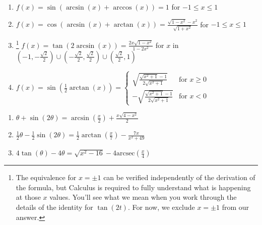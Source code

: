 \documentclass{ximera}
\begin{document}
\begin{enumerate}
\item $f(x) =\sin \left( \arcsin(x) + \arccos(x) \right) = 1$ for $-1 \leq x \leq 1$
\item $f(x) =\cos \left( \arcsin(x) + \arctan(x) \right) = \frac{\sqrt{1 - x^{2}} - x^{2}}{\sqrt{1 + x^{2}}}$ for $-1 \leq x \leq 1$
\item\!\!\footnote{The equivalence for $x = \pm 1$ can be verified independently of the derivation of the formula, but Calculus is required to fully understand what is happening at those $x$ values.  You'll see what we mean when you work through the details of the identity for $\tan(2t).$  For now, we exclude $x = \pm 1$ from our answer.} $f(x) =\tan \left( 2\arcsin(x) \right) = \frac{2x\sqrt{1 - x^{2}}}{1 - 2x^{2}}$ for $x$ in $\left(-1, -\frac{\sqrt{2}}{2}\right) \cup \left(-\frac{\sqrt{2}}{2}, \frac{\sqrt{2}}{2} \right) \cup \left(\frac{\sqrt{2}}{2}, 1\right)$
\item $f(x) =\sin \left( \frac{1}{2}\arctan(x) \right) = \left\{ \begin{array}{rr} \sqrt{\frac{\sqrt{x^{2} + 1} - 1}{2\sqrt{x^{2} + 1}}} & \text{for $x \geq 0$} \\ [10pt] -\sqrt{\frac{\sqrt{x^{2} + 1} - 1}{2\sqrt{x^{2} + 1}}} & \text{for $x < 0$}  \end{array}\right. $ 

\setcounter{HW}{\value{enumi}}

\end{enumerate}

\begin{enumerate}

\setcounter{enumi}{\value{HW}}

\item  $\theta + \sin(2\theta) = \arcsin \left( \frac{x}{2} \right) + \frac{x\sqrt{4 - x^{2}}}{2}$

\item  $\frac{1}{2}\theta - \frac{1}{2}\sin(2\theta) = \frac{1}{2} \arctan \left( \frac{x}{7} \right) - \frac{7x}{x^{2} + 49}$

\item   $4\tan(\theta) - 4\theta = \sqrt{x^{2} - 16} - 4\mbox{arcsec} \left( \frac{x}{4} \right)$

\setcounter{HW}{\value{enumi}}

\end{enumerate}
\end{document}
